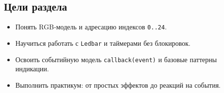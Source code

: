 \subsection*{Цели раздела}
\begin{itemize}
\item Понять RGB‑модель и адресацию индексов \texttt{0..24}.
\item Научиться работать с \texttt{Ledbar} и таймерами без блокировок.
\item Освоить событийную модель \texttt{callback(event)} и базовые паттерны индикации.
\item Выполнить практикум: от простых эффектов до реакций на события.
\end{itemize}

